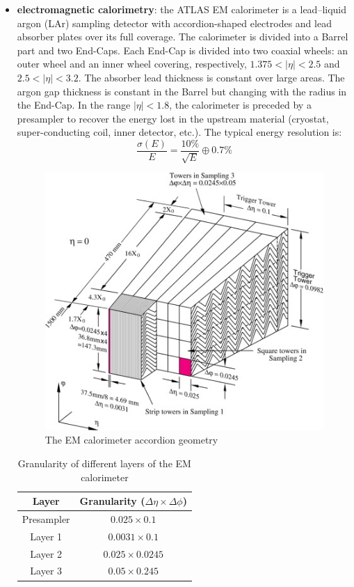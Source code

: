 \documentclass[a4paper, oneside, 11pt, openright]{book}
\begin{document}
					\begin{itemize}
						\item \textbf{electromagnetic calorimetry}:
						the ATLAS EM calorimeter is a lead–liquid argon (LAr) sampling detector with accordion-shaped electrodes and lead absorber plates over its full coverage. The calorimeter is divided into a Barrel part and two End-Caps. Each End-Cap is divided into two coaxial wheels: an outer wheel and an inner wheel covering, respectively, $1.375<|\eta|<2.5$ and $2.5<|\eta|<3.2$. The absorber lead thickness is constant over large areas. The argon gap thickness is constant in the Barrel but changing with the radius in the End-Cap.
						In the range $|\eta|<1.8$, the calorimeter is preceded by a presampler to recover the energy lost in the upstream material (cryostat, super-conducting coil, inner detector, etc.). The typical energy resolution is:
						$$ 
						\frac{\sigma(E)}{E} = \frac{10\%}{\sqrt{E}} \oplus 0.7\%
						$$
						
						\begin{figure}[h!]
							\centering
							\includegraphics[width=.6\textwidth]{tesi_images/calo_struct.jpg}
							\caption{The EM calorimeter accordion geometry}
							\label{fig:calo struct}
						\end{figure}
						\begin{table}[h!]
							\centering
							\begin{tabular}{cc}
								\toprule[1.5pt]
								\textbf{Layer} & \textbf{Granularity ($\Delta\eta \times \Delta\phi$)} \\
								\midrule
								Presampler & $0.025 \times 0.1$ \\
								Layer 1 & $0.0031 \times 0.1$ \\
								Layer 2 & $0.025 \times 0.0245$ \\
								Layer 3 & $0.05 \times 0.245$ \\
								\bottomrule[1.5pt]
							\end{tabular}
								\caption{Granularity of different layers of the EM calorimeter}\label{tab:granularity}
							

\end{table}
\end{itemize}
\end{document}
